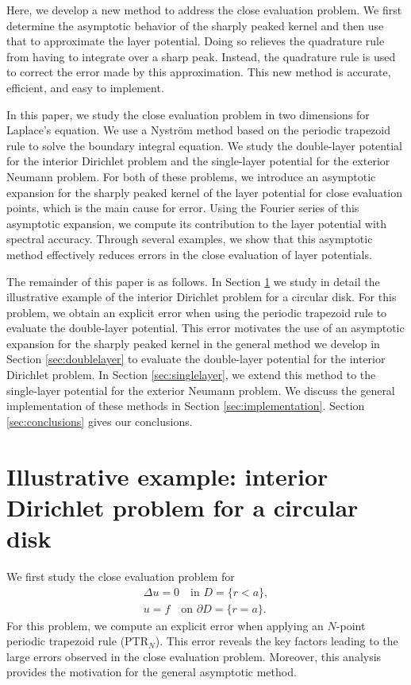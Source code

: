 \documentclass{article}[12pt]
\numberwithin{equation}{section}
\begin{document}
Here, we develop a new method to address the close
  evaluation problem. We first determine the asymptotic behavior of
  the sharply peaked kernel and then use that to approximate the layer
  potential. Doing so relieves the quadrature rule from having to
  integrate over a sharp peak. Instead, the quadrature rule is used to
  correct the error made by this approximation.  This new method is
  accurate, efficient, and easy to implement.

In this paper, we study the close evaluation problem in two dimensions
for Laplace's equation. We use a Nystr\"om method based on the
periodic trapezoid rule to solve the boundary integral equation.  We
study the double-layer potential for the interior Dirichlet problem
and the single-layer potential for the exterior Neumann problem. For
both of these problems, we introduce an asymptotic expansion for the
sharply peaked kernel of the layer potential for close evaluation
points, which is the main cause for error.  Using the Fourier series
of this asymptotic expansion, we compute its contribution to the layer
potential with spectral accuracy.  Through several examples, we show
that this asymptotic method effectively reduces errors in the close
evaluation of layer potentials.

The remainder of this paper is as follows. In Section \ref{sec:circle}
we study in detail the illustrative example of the interior Dirichlet
problem for a circular disk. For this problem, we obtain an explicit
error when using the periodic trapezoid rule to evaluate the
double-layer potential. This error motivates the use of an asymptotic
expansion for the sharply peaked kernel in the general method we
develop in Section \ref{sec:doublelayer} to evaluate the double-layer
potential for the interior Dirichlet problem. In Section
\ref{sec:singlelayer}, we extend this method to the single-layer
potential for the exterior Neumann problem. We discuss the general
implementation of these methods in Section
\ref{sec:implementation}. Section
  \ref{sec:conclusions} gives our conclusions.

\section{Illustrative example: interior Dirichlet problem for a
  circular disk}
\label{sec:circle}

We first study the close evaluation problem for 
\begin{subequations}
  \begin{gather}
    \Delta u = 0 \quad \text{in $D = \{ r < a \}$}, \label{eq:2.1a}\\
    u=f \quad \text{on $\partial D = \{ r = a \}$}. \label{eq:2.1b}
  \end{gather}
  \label{eq:2.1}
\end{subequations}
For this problem, we compute an explicit error when
  applying an $N$-point periodic trapezoid rule (PTR$_{N}$). This
  error reveals the key factors leading to the large errors observed
  in the close evaluation problem. Moreover, this analysis provides
  the motivation for the general asymptotic method.
\end{document}
